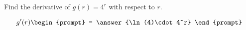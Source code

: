 \documentclass{ximera}
\author{Gregory Hartman \and Matthew Carr}
\begin{document}
\begin{exercise}



Find the derivative of $g(r)=4^r$ with respect to $r$.

\[
g'(r)
\begin{prompt}
= \answer{\ln(4)\cdot 4^r}
\end{prompt}
\]

\end{exercise}
\end{document}
